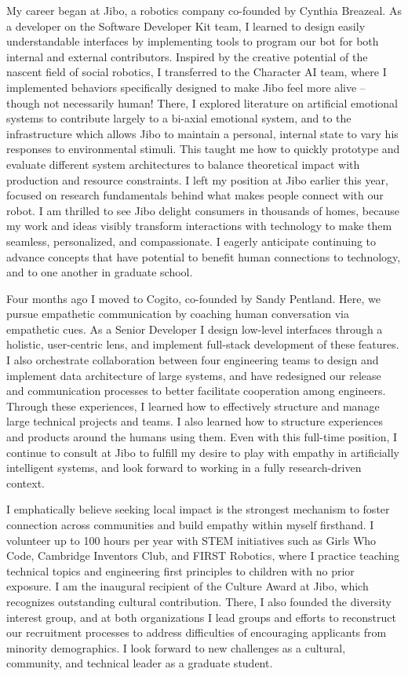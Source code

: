 \documentclass{article}
\begin{document}
	My career began at Jibo, a robotics company co-founded by Cynthia Breazeal. As a developer on the Software Developer Kit team, I learned to design easily understandable interfaces by implementing tools to program our bot for both internal and external contributors. Inspired by the creative potential of the nascent field of social robotics, I transferred to the Character AI team, where I implemented behaviors specifically designed to make Jibo feel more alive -- though not necessarily human! There, I explored literature on artificial emotional systems to contribute largely to a bi-axial emotional system, and to the infrastructure which allows Jibo to maintain a personal, internal state to vary his responses to environmental stimuli. This taught me how to quickly prototype and evaluate different system architectures to balance theoretical impact with production and resource constraints. I left my position at Jibo earlier this year, focused on research fundamentals behind what makes people connect with our robot. I am thrilled to see Jibo delight consumers in thousands of homes, because my work and ideas visibly transform interactions with technology to make them seamless, personalized, and compassionate. I eagerly anticipate continuing to advance concepts that have potential to benefit human connections to technology, and to one another in graduate school. \par
	Four months ago I moved to Cogito, co-founded by Sandy Pentland. Here, we pursue empathetic communication by coaching human conversation via empathetic cues. As a Senior Developer I design low-level interfaces through a holistic, user-centric lens, and implement full-stack development of these features. I also orchestrate collaboration between four engineering teams to design and implement data architecture of large systems, and have redesigned our release and communication processes to better facilitate cooperation among engineers. Through these experiences, I learned how to effectively structure and manage large technical projects and teams. I also learned how to structure experiences and products around the humans using them. Even with this full-time position, I continue to consult at Jibo to fulfill my desire to play with empathy in artificially intelligent systems, and look forward to working in a fully research-driven context. \par
	I emphatically believe seeking local impact is the strongest mechanism to foster connection across communities and build empathy within myself firsthand. I volunteer up to 100 hours per year with STEM initiatives such as Girls Who Code, Cambridge Inventors Club, and FIRST Robotics, where I practice teaching technical topics and engineering first principles to children with no prior exposure. I am the inaugural recipient of the Culture Award at Jibo, which recognizes outstanding cultural contribution. There, I also founded the diversity interest group, and at both organizations I lead groups and efforts to reconstruct our recruitment processes to address difficulties of encouraging applicants from minority demographics. I look forward to new challenges as a cultural, community, and technical leader as a graduate student. \par
\end{document}
